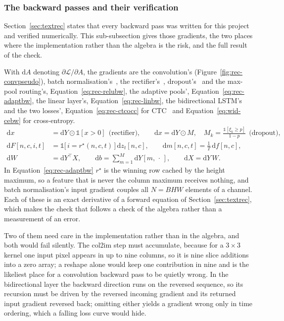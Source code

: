 \subsubsection{The backward passes and their verification}

Section~\ref{sec:textrec} states that every backward pass was written for this project and verified numerically.
This sub-subsection gives those gradients, the two places where the implementation rather than the algebra is the risk, and the full result of the check.

With $\mathrm dA$ denoting $\partial\mathcal L/\partial A$, the gradients are the convolution's (Figure~\ref{fig:rec-convpseudo}), batch normalisation's~\cite[Alg.~1]{ioffe2015}, the rectifier's~\cite[p.~807]{nair2010}, dropout's~\cite[p.~1930]{srivastava2014} and the max-pool routing's, Equation~\ref{eq:rec-relubw}, the adaptive pools', Equation~\ref{eq:rec-adaptbw}, the linear layer's, Equation~\ref{eq:rec-linbw}, the bidirectional LSTM's~\cite{hochreiter1997} and the two losses', Equation~\ref{eq:rec-ctcocc} for CTC~\cite[p.~372]{graves2006} and Equation~\ref{eq:wid-cebw} for cross-entropy.
\begin{align}
\mathrm dx&=\mathrm dY\odot\mathbb 1[x>0]\ \ \text{(rectifier)},\qquad
\mathrm dx=\mathrm dY\odot M,\quad M_k=\frac{\mathbb 1[\xi_k\ge p]}{1-p}\ \ \text{(dropout)},\label{eq:rec-relubw}\\
\mathrm dF[n,c,i,t]&=\mathbb 1\bigl[\,i=r^{\star}(n,c,t)\,\bigr]\,\mathrm dz_t[n,c],\qquad
\mathrm dm[n,c,t]=\frac{1}{T}\,\mathrm df[n,c],\label{eq:rec-adaptbw}\\
\mathrm dW&=\mathrm dY^{\top}X,\qquad \mathrm db=\sum_{m=1}^{M}\mathrm dY[m,\,\cdot\,],\qquad \mathrm dX=\mathrm dY\,W.\label{eq:rec-linbw}
\end{align}
In Equation~\ref{eq:rec-adaptbw} $r^{\star}$ is the winning row cached by the height maximum, so a feature that is never the column maximum receives nothing, and batch normalisation's input gradient couples all $N=BHW$ elements of a channel.
Each of these is an exact derivative of a forward equation of Section~\ref{sec:textrec}, which makes the check that follows a check of the algebra rather than a measurement of an error.

Two of them need care in the implementation rather than in the algebra, and both would fail silently.
The col2im step must accumulate, because for a $3\times3$ kernel one input pixel appears in up to nine columns, so it is nine slice additions into a zero array; a reshape alone would keep one contribution in nine and is the likeliest place for a convolution backward pass to be quietly wrong.
In the bidirectional layer the backward direction runs on the reversed sequence, so its recursion must be driven by the reversed incoming gradient and its returned input gradient reversed back; omitting either yields a gradient wrong only in time ordering, which a falling loss curve would hide.

